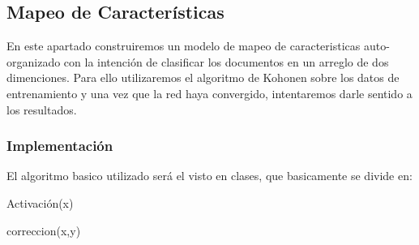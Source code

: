 


\subsection{Mapeo de Características}

En este apartado construiremos un modelo de mapeo de caracteristicas auto-organizado con la intención de clasificar los documentos en un arreglo de dos dimenciones. Para ello utilizaremos el algoritmo de Kohonen sobre los datos de entrenamiento y una vez que la red haya convergido, intentaremos darle sentido a los resultados.

\subsubsection{Implementación}

El algoritmo basico utilizado será el visto en clases, que basicamente se divide en:

\begin{algorithm}
\begin{algorithmic}[1]\parskip=1mm
 \caption{ Activación(x)}
\end{algorithmic}
\end{algorithm}


\begin{algorithm}
\begin{algorithmic}[1]\parskip=1mm
 \caption{ correccion(x,y)}
\end{algorithmic}
\end{algorithm}


